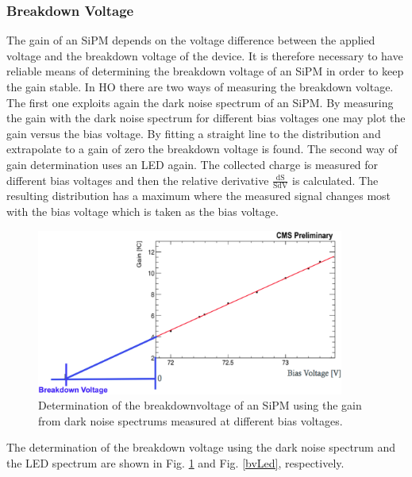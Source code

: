\subsubsection{Breakdown Voltage}
The gain of an SiPM depends on the voltage difference between the applied voltage and the breakdown voltage of the device. It is therefore necessary to have reliable means of determining the breakdown voltage of an SiPM in order to keep the gain stable. In HO there are two ways of measuring the breakdown voltage. The first one exploits again the dark noise spectrum of an SiPM. By measuring the gain with the dark noise spectrum for different bias voltages one may plot the gain versus the bias voltage. By fitting a straight line to the distribution and extrapolate to a gain of zero the breakdown voltage is found. The second way of gain determination uses an LED again. The collected charge is measured for different bias voltages and then the relative derivative $\frac{\text{dS}}{\text{SdV}}$ is calculated. The resulting distribution has a maximum where the measured signal changes most with the bias voltage which is taken as the bias voltage. 
\begin{figure}[bh]
\centering
\includegraphics[width=0.9\textwidth]{Bilder/bvPedDetermination.png}
\caption{Determination of the breakdownvoltage of an SiPM using the gain from dark noise spectrums measured at different bias voltages.}
\label{bvPed}
\end{figure}
The determination of the breakdown voltage using the dark noise spectrum and the LED spectrum are shown in Fig. \ref{bvPed} and Fig. \ref{bvLed}, respectively.
